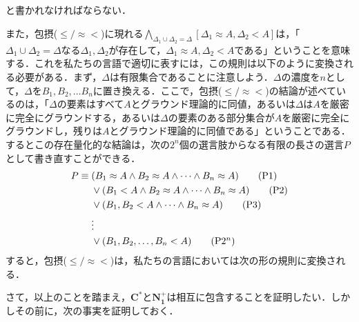 \documentclass[twoside,14Q,uplatex,dvipdfmx]{jsarticle}
\theoremstyle{definition}
\begin{document}
と書かれなければならない．

また，包摂($\leq/\approx<$)に現れる$\bigwedge_{\Delta_1\cup\Delta_2=\Delta}[\Delta_1\approx A, \Delta_2<A]$は，「$\Delta_1\cup\Delta_2=\Delta$なる$\Delta_1, \Delta_2$が存在して，$\Delta_1\approx A, \Delta_2<A$である」ということを意味する．これを私たちの言語で適切に表すには，この規則は以下のように変換される必要がある．まず，$\Delta$は有限集合であることに注意しよう．$\Delta$の濃度を$n$として，$\Delta$を$B_1, B_2, \ldots B_n$に置き換える．ここで，包摂($\leq/\approx<$)の結論が述べているのは，「$\Delta$の要素はすべて$A$とグラウンド理論的に同値，あるいは$\Delta$は$A$を厳密に完全にグラウンドする，あるいは$\Delta$の要素のある部分集合が$A$を厳密に完全にグラウンドし，残りは$A$とグラウンド理論的に同値である」ということである．するとこの存在量化的な結論は，次の$2^{n}$個の選言肢からなる有限の長さの選言$P$として書き直すことができる．
\begin{align}
P\equiv\;&(B_1\approx A\land B_2\approx A\land\cdots\land B_n\approx A)\tag{P1}\\
&\lor(B_1<A\land B_2\approx A\land\cdots\land B_n\approx A)\tag{P2}\\
&\lor(B_1, B_2<A\land\cdots\land B_n\approx A)\tag{P3}\\
&\vdots\notag\\
&\lor(B_1, B_2, \ldots, B_n<A)\tag{P2$^{n}$}
\end{align}
すると，包摂($\leq/\approx<$)は，私たちの言語においては次の形の規則に変換される．

\begin{prooftree}
\end{prooftree}

さて，以上のことを踏まえ，$\mathbf{C^{*}}$と$\mathbf{N_{1}^{+}}$は相互に包含することを証明したい．しかしその前に，次の事実を証明しておく．
\end{document}
